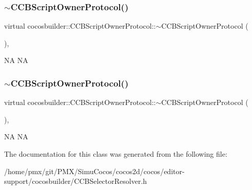 \subsubsection{\texorpdfstring{$\sim$\+C\+C\+B\+Script\+Owner\+Protocol()}{~CCBScriptOwnerProtocol()}\hspace{0.1cm}{\footnotesize\ttfamily [1/2]}}
{\footnotesize\ttfamily virtual cocosbuilder\+::\+C\+C\+B\+Script\+Owner\+Protocol\+::$\sim$\+C\+C\+B\+Script\+Owner\+Protocol (\begin{DoxyParamCaption}{ }\end{DoxyParamCaption})\hspace{0.3cm}{\ttfamily [inline]}, {\ttfamily [virtual]}}

NA  NA \mbox{\label{classcocosbuilder_1_1CCBScriptOwnerProtocol_aadb1033db4cfc1c89293aeb00144ab08}} 
\subsubsection{\texorpdfstring{$\sim$\+C\+C\+B\+Script\+Owner\+Protocol()}{~CCBScriptOwnerProtocol()}\hspace{0.1cm}{\footnotesize\ttfamily [2/2]}}
{\footnotesize\ttfamily virtual cocosbuilder\+::\+C\+C\+B\+Script\+Owner\+Protocol\+::$\sim$\+C\+C\+B\+Script\+Owner\+Protocol (\begin{DoxyParamCaption}{ }\end{DoxyParamCaption})\hspace{0.3cm}{\ttfamily [inline]}, {\ttfamily [virtual]}}

NA  NA 

The documentation for this class was generated from the following file\+:\begin{DoxyCompactItemize}
\item 
/home/pmx/git/\+P\+M\+X/\+Simu\+Cocos/cocos2d/cocos/editor-\/support/cocosbuilder/C\+C\+B\+Selector\+Resolver.\+h\end{DoxyCompactItemize}
